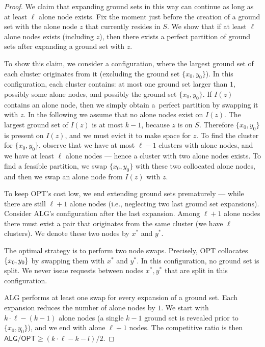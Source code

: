 \documentclass[manuscript,screen=true, review, anonymous]{acmart}
\newcommand{\OPT}{\textsf{OPT}\xspace}
\newcommand{\ALG}{\textsf{ALG}\xspace}
\DeclarePairedDelimiter\set{\{}{\}}
\begin{document}
\begin{proof}
	We claim that expanding ground sets in this way can continue as long as at least $\ell$ alone node exists.
	Fix the moment just before the creation of a ground set with the alone node $z$ that currently resides in $S$.
	We show that if at least $\ell$ alone nodes exists (including $z$), then there exists a perfect partition of ground sets after expanding a ground set with $z$.
	
	To show this claim, we consider a configuration, where the largest ground set of each cluster originates from it (excluding the ground set $\{x_0, y_0\}$).
	In this configuration, each cluster contains:  at most one ground set larger than $1$, possibly some alone nodes, and possibly the ground set $\{x_0, y_0\}$.
	If $I(z)$ contains an alone node, then we simply obtain a~perfect partition by swapping it with $z$.
	In the following we assume that no alone nodes exist on $I(z)$.
	The largest ground set of $I(z)$ is at most $k-1$, because $z$ is on $S$.
	Therefore $\{x_0, y_0\}$ is present on $I(z)$, and we must evict it to make space for $z$.
	To find the cluster for $\{x_0, y_0\}$, observe that we have at most $\ell-1$ clusters with alone nodes, and we have at least $\ell$ alone nodes --- hence a cluster with two alone nodes exists.
	To find a feasible partition, we swap $\{x_0, y_0\}$ with these two collocated alone nodes, and then we swap an alone node from $I(z)$ with $z$.
	

	To keep \OPT's cost low, we end extending ground sets prematurely --- while there are still $\ell+1$ alone nodes (i.e., neglecting two last ground set expansions).
	Consider \ALG's configuration after the last expansion.
	Among $\ell+1$ alone nodes there must exist a pair that originates from the same cluster (we have $\ell$ clusters). 
	We denote these two nodes by $x^*$ and $y^*$.

	The optimal strategy is to perform two node swaps.
	Precisely, \OPT collocates $\set{x_0,y_0}$ by swapping them with $x^*$ and $y^*$.
	In this configuration, no ground set is split.
	We never issue requests between nodes $x^*, y^*$ that are split in this configuration.


	\ALG performs at least one swap for every expansion of a ground set.
	Each expansion reduces the number of alone nodes by $1$.
	We start with $k \cdot \ell - (k-1)$ alone nodes (a single $k-1$ ground set is revealed prior to $\{x_0, y_0\}$), and we end with alone $\ell+1$ nodes.
	The competitive ratio is then $\ALG / \OPT \geq (k\cdot \ell - k - l) / 2$.
\end{proof}
\end{document}
